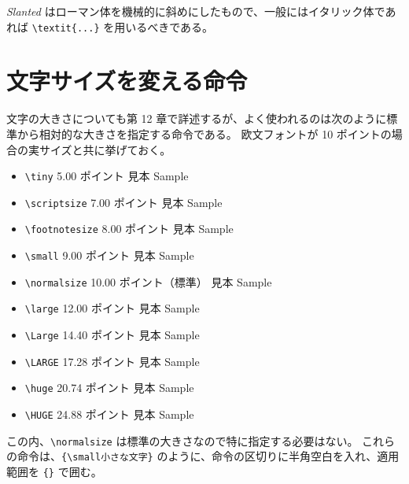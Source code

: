 \textsl{Slanted} はローマン体を機械的に斜めにしたもので、一般にはイタリック体であれば \verb'\textit{...}' を用いるべきである。
\section{文字サイズを変える命令}
文字の大きさについても第 12 章で詳述するが、よく使われるのは次のように標準から相対的な大きさを指定する命令である。
欧文フォントが 10 ポイントの場合の実サイズと共に挙げておく。
\begin{itemize}\setlength{\leftskip}{-1.00zw}%
\item \verb'\tiny'          5.00 ポイント         {\tiny{}         見本 Sample}
\item \verb'\scriptsize'    7.00 ポイント         {\scriptsize{}   見本 Sample}
\item \verb'\footnotesize'  8.00 ポイント         {\footnotesize{} 見本 Sample}
\item \verb'\small'         9.00 ポイント         {\small{}        見本 Sample}
\item \verb'\normalsize'   10.00 ポイント（標準） {\normalsize{}   見本 Sample}
\item \verb'\large'        12.00 ポイント         {\large{}        見本 Sample}
\item \verb'\Large'        14.40 ポイント         {\Large{}        見本 Sample}
\item \verb'\LARGE'        17.28 ポイント         {\LARGE{}        見本 Sample}
\item \verb'\huge'         20.74 ポイント         {\huge{}         見本 Sample}
\item \verb'\HUGE'         24.88 ポイント         {\HUGE{}         見本 Sample}
\end{itemize}
この内、\verb'\normalsize' は標準の大きさなので特に指定する必要はない。\enlargethispage{+1.00zw}
これらの命令は、\verb'{\small'\textvisiblespace\verb'小さな文字}' のように、命令の区切りに半角空白を入れ、適用範囲を \verb'{}' で囲む。
